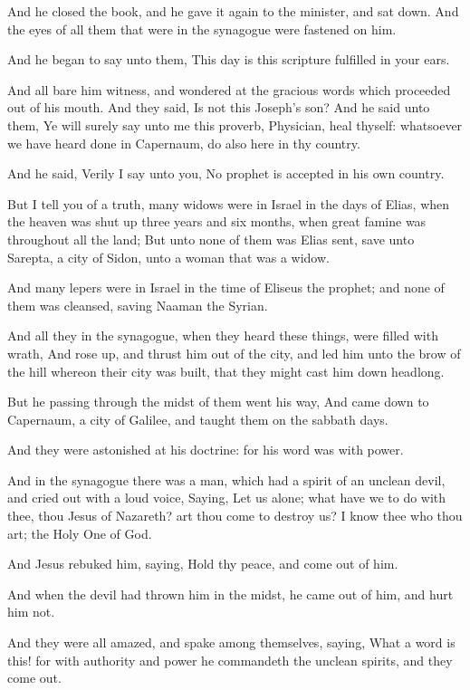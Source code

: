 \verse And he closed the book, and he gave it again to the minister, and sat down. And the eyes of all them that were in the synagogue were fastened on him.

\verse And he began to say unto them, This day is this scripture fulfilled in your ears.

\verse And all bare him witness, and wondered at the gracious words which proceeded out of his mouth. And they said, Is not this Joseph's son?  \verse And he said unto them, Ye will surely say unto me this proverb, Physician, heal thyself: whatsoever we have heard done in Capernaum, do also here in thy country.

\verse And he said, Verily I say unto you, No prophet is accepted in his own country.

\verse But I tell you of a truth, many widows were in Israel in the days of Elias, when the heaven was shut up three years and six months, when great famine was throughout all the land; \verse But unto none of them was Elias sent, save unto Sarepta, a city of Sidon, unto a woman that was a widow.

\verse And many lepers were in Israel in the time of Eliseus the prophet; and none of them was cleansed, saving Naaman the Syrian.

\verse And all they in the synagogue, when they heard these things, were filled with wrath, \verse And rose up, and thrust him out of the city, and led him unto the brow of the hill whereon their city was built, that they might cast him down headlong.

\verse But he passing through the midst of them went his way, \verse And came down to Capernaum, a city of Galilee, and taught them on the sabbath days.

\verse And they were astonished at his doctrine: for his word was with power.

\verse And in the synagogue there was a man, which had a spirit of an unclean devil, and cried out with a loud voice, \verse Saying, Let us alone; what have we to do with thee, thou Jesus of Nazareth? art thou come to destroy us? I know thee who thou art; the Holy One of God.

\verse And Jesus rebuked him, saying, Hold thy peace, and come out of him.

And when the devil had thrown him in the midst, he came out of him, and hurt him not.

\verse And they were all amazed, and spake among themselves, saying, What a word is this! for with authority and power he commandeth the unclean spirits, and they come out.

